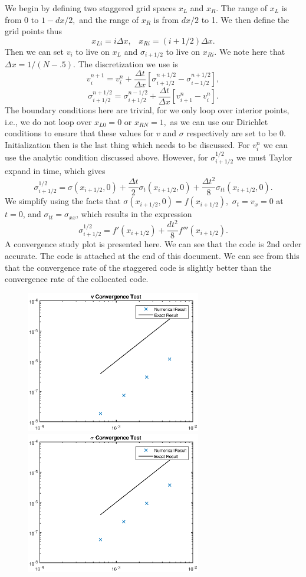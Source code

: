 We begin by defining two staggered grid spaces $x_L$ and $x_R$. The range of $x_L$ is from 0 to $1-dx/2,$ and the range of $x_R$ is from $dx/2$ to 1. We then define the grid points thus
$$x_{Li}=i\Delta x,\;\;\; x_{Ri}=(i+1/2)\Delta x.$$
Then we can set $v_i$ to live on $x_L$ and $\sigma_{i+1/2}$ to live on $x_{Ri}$. We note here that $\Delta x=1/(N-.5)$. The discretization we use is
$$v_i^{n+1}=v_i^n+\frac{\Delta t}{\Delta x}[\sigma_{i+1/2}^{n+1/2}-\sigma_{i-1/2}^{n+1/2}],$$
$$\sigma_{i+1/2}^{n+1/2}=\sigma_{i+1/2}^{n-1/2}+\frac{\Delta t}{\Delta x}[v_{i+1}^n-v_i^n].$$
The boundary conditions here are trivial, for we only loop over interior points, i.e., we do not loop over $x_{L0}=0$ or $x_{RN}=1,$ as we can use our Dirichlet conditions to ensure that these values for $v$ and $\sigma$ respectively are set to be 0. Initialization then is the last thing which needs to be discussed. For $v_i^n$ we can use the analytic condition discussed above. However, for $\sigma_{i+1/2}^{1/2}$ we must Taylor expand in time, which gives
$$\sigma_{i+1/2}^{1/2}=\sigma(x_{i+1/2},0)+\frac{\Delta t}{2}\sigma_t(x_{i+1/2},0)+\frac{\Delta t^2}{8}\sigma_{tt}(x_{i+1/2},0).$$
We simplify using the facts that $\sigma(x_{i+1/2},0)=f(x_{i+1/2}),$ $\sigma_t=v_x=0$ at $t=0$, and $\sigma_{tt}=\sigma_{xx}$, which results in the expression
$$\sigma_{i+1/2}^{1/2}=f'(x_{i+1/2})+\frac{dt^2}{8}f'''(x_{i+1/2}).$$
A convergence study plot is presented here. We can see that the code is 2nd order accurate. The code is attached at the end of this document. We can see from this that the convergence rate of the staggered code is slightly better than the convergence rate of the collocated code.
\begin{figure}[h]
\centering
\includegraphics[width=3in]{stagVConv}
\includegraphics[width=3in]{stagSConv}
\end{figure}


